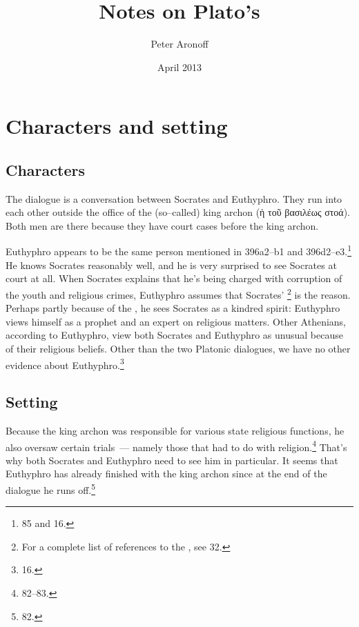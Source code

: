 \documentclass[11pt]{article}
\begin{document}
\begin{titlepage}
\title{Notes on Plato's }
\author{Peter Aronoff}
\date{April 2013}
\maketitle
\end{titlepage}

\section{Characters and setting}

\subsection{Characters}

The dialogue is a conversation between Socrates and Euthyphro.  They run
into each other outside the office of the (so--called) king archon (ἡ τοῦ
βασιλέως στοά).  Both men are there because they have court cases before
the king archon.

Euthyphro appears to be the same person mentioned in 
396a2--b1 and 396d2--e3.\footnote{\citet{burnet1924} 85 and
\citet{bailly2003} 16.}  He knows Socrates reasonably well, and he is very
surprised to see Socrates at court at all.  When Socrates explains that he's
being charged with corruption of the youth and religious crimes, Euthyphro
assumes that Socrates' \footnote{For a complete list of
references to the , see \citet{bailly2003} 32.}
is the reason.  Perhaps partly because of the , he sees
Socrates as a kindred spirit: Euthyphro views himself as a prophet and an
expert on religious matters.  Other Athenians, according to Euthyphro, view
both Socrates and Euthyphro as unusual because of their religious beliefs.
Other than the two Platonic dialogues, we have no other evidence about
Euthyphro.\footnote{\citet{bailly2003} 16.}

\subsection{Setting}

Because the king archon was responsible for various state religious
functions, he also oversaw certain trials~--- namely those that had to do
with religion.\footnote{\citet{burnet1924} 82--83.}  That's why both
Socrates and Euthyphro need to see him in particular.  It seems that
Euthyphro has already finished with the king archon since at the end of the
dialogue he runs off.\footnote{\citet{burnet1924} 82.}
\end{document}

